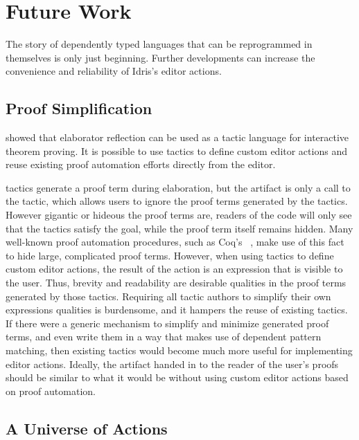 \section{Future Work}

The story of dependently typed languages that can be reprogrammed in
themselves is only just beginning. Further developments can increase
the convenience and reliability of Idris's editor actions.

\subsection{Proof Simplification}
\label{sssec:simplification}

\citet{elabref} showed that elaborator reflection can be used as a
tactic language for interactive theorem proving. It is possible to use
\Elab{} tactics to define custom editor actions and reuse existing
proof automation efforts directly from the editor.

\Elab{} tactics generate a proof term during elaboration, but the
artifact is only a call to the tactic, which allows users to ignore
the proof terms generated by the tactics. However gigantic or hideous
the proof terms are, readers of the code will only see that the
tactics satisfy the goal, while the proof term
itself remains hidden. Many well-known proof automation procedures, such as Coq's
~\cite{omega}, make use of this fact to hide large, complicated proof terms.  However, when using
\Elab{} tactics to define custom editor actions, the result of the
action is an expression that is visible to the user. Thus, brevity and
readability are desirable qualities in the proof terms generated by
those tactics.  Requiring all tactic authors to simplify their own
expressions qualities is burdensome, and it hampers the reuse of
existing tactics.  If there were a generic mechanism to simplify and
minimize generated proof terms, and even write them in a way that
makes use of dependent pattern matching, then existing tactics would become
much more useful for implementing editor actions. Ideally, the
artifact handed in to the reader of the user's proofs should be similar
to what it would be without using custom editor actions based on proof
automation.

\subsection{A Universe of Actions}
\label{sssec:universeEncoding}

